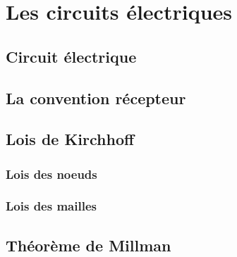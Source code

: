 \chapter{Les circuits électriques}

\section{Circuit électrique}

\section{La convention récepteur}

\section{Lois de Kirchhoff}
\subsection*{Lois des noeuds}
\subsection*{Lois des mailles}

\section{Théorème de Millman}

